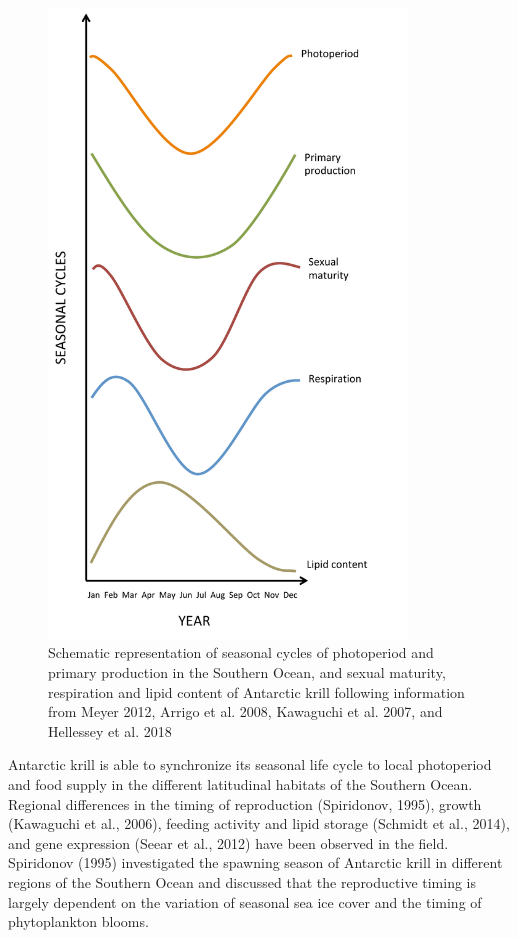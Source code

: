 \begin{figure}
        \caption{Schematic representation of seasonal cycles of photoperiod and
        primary production in the Southern Ocean, and sexual maturity,
        respiration and lipid content of Antarctic krill following information
        from Meyer 2012, Arrigo et al. 2008, Kawaguchi et al. 2007, and
        Hellessey et al. 2018}
        \centering
        \includegraphics[width=0.85\textwidth]{../Figures/Figure2.pdf}
\end{figure}

Antarctic krill is able to synchronize its seasonal life cycle to local
photoperiod and food supply in the different latitudinal habitats of the
Southern Ocean. Regional differences in the timing of reproduction (Spiridonov,
1995), growth (Kawaguchi et al., 2006), feeding activity and lipid storage
(Schmidt et al., 2014), and gene expression (Seear et al., 2012) have been
observed in the field. Spiridonov (1995) investigated the spawning season of
Antarctic krill in different regions of the Southern Ocean and discussed that
the reproductive timing is largely dependent on the variation of  seasonal sea
ice cover and the timing of phytoplankton blooms. 

